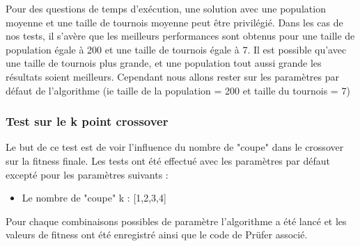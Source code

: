 \documentclass{article} %
\begin{document}
Pour des questions de temps d'exécution, une solution avec une population moyenne et une taille de tournois moyenne peut être privilégié. Dans les cas de nos tests, il s'avère que les meilleurs performances sont obtenus pour une taille de population égale à 200 et une taille de tournois égale à 7. Il est possible qu'avec une taille de tournois plus grande, et une population tout aussi grande les résultats soient meilleurs. Cependant nous allons rester sur les paramètres par défaut de l'algorithme (ie taille de la population = 200 et taille du tournois = 7)

\subsubsection{Test sur le k point crossover}
Le but de ce test est de voir l'influence du nombre de "coupe" dans le crossover sur la fitness finale. Les tests ont été effectué avec les paramètres par défaut excepté pour les paramètres suivants :
\begin{itemize}
	\item Le nombre de "coupe" k : [1,2,3,4]
\end{itemize}
Pour chaque combinaisons possibles de paramètre l'algorithme a été lancé et les valeurs de fitness ont été enregistré ainsi que le code de Prüfer associé.
\end{document}
